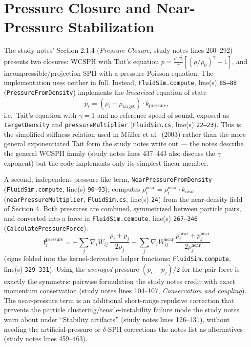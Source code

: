 \documentclass[11pt]{article}
\newcommand{\loc}[2]{\texttt{#1}, line(s) \texttt{#2}}
\begin{document}
\section{Pressure Closure and Near-Pressure Stabilization}
\label{sec:nearpressure}

The study notes' Section 2.1.4 (\emph{Pressure Closure}, study notes lines
260--292) presents two closures: WCSPH with Tait's equation
$p=\frac{\rho_0c_0^2}{\gamma}\left[(\rho/\rho_0)^\gamma-1\right]$, and
incompressible/projection SPH with a pressure Poisson equation. The
implementation uses neither in full. Instead,
\loc{FluidSim.compute}{85--88} (\texttt{PressureFromDensity}) implements the
\emph{linearized} equation of state
\begin{equation*}
    p_i = (\rho_i - \rho_{\text{target}})\cdot k_{\text{pressure}},
\end{equation*}
i.e.\ Tait's equation with $\gamma=1$ and no reference speed of sound,
exposed as \texttt{targetDensity} and \texttt{pressureMultiplier}
(\loc{FluidSim.cs}{22--23}). This is the simplified stiffness relation used
in M\"uller et al.\ (2003) rather than the more general exponentiated Tait
form the study notes write out --- the notes describe the general WCSPH
family (study notes lines 437--443 also discuss the $\gamma$ exponent) but
the code implements only its simplest linear member.

A second, independent pressure-like term, \texttt{NearPressureFromDensity}
(\loc{FluidSim.compute}{90--93}), computes
$p_i^{\text{near}}=\rho_i^{\text{near}}\cdot k_{\text{near}}$
(\texttt{nearPressureMultiplier}, \loc{FluidSim.cs}{24}) from the
near-density field of Section 4. Both pressures are combined, symmetrized
between particle pairs, and converted into a force in
\loc{FluidSim.compute}{267--346} (\texttt{CalculatePressureForce}):
\begin{equation*}
    \mathbf{f}_i^{\text{pressure}} = -\sum_j
        \nabla_iW_{ij}\,\frac{p_i+p_j}{2\rho_j}
        -\sum_j
        \nabla_iW^{\text{near}}_{ij}\,\frac{p_i^{\text{near}}+p_j^{\text{near}}}{2\rho_j^{\text{near}}}
\end{equation*}
(signs folded into the kernel-derivative helper functions;
\loc{FluidSim.compute}{329--331}). Using the \emph{averaged} pressure
$(p_i+p_j)/2$ for the pair force is exactly the symmetric pairwise
formulation the study notes credit with exact momentum conservation (study
notes lines 104--107, \emph{Conservation and coupling}). The near-pressure
term is an additional short-range repulsive correction that prevents the
particle clustering/tensile-instability failure mode the study notes warn
about under ``Stability artifacts'' (study notes lines 126--131), without
needing the artificial-pressure or $\delta$-SPH corrections the notes list
as alternatives (study notes lines 459--463).
\end{document}

